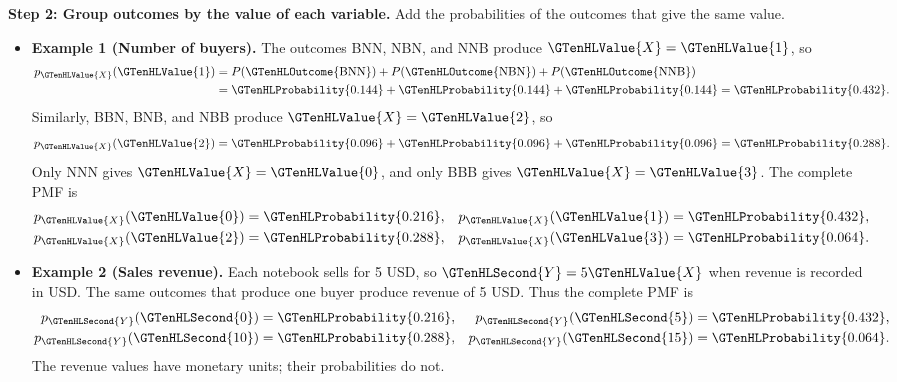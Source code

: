 \textbf{Step 2: Group outcomes by the value of each variable.} Add the probabilities of the outcomes that give the same value.

\begin{itemize}
	\item \textbf{Example 1 (Number of buyers).}
	The outcomes BNN, NBN, and NNB produce $\GTenHLValue{X}=\GTenHLValue{1}$, so
	\[
	\begin{aligned}
		p_{\GTenHLValue{X}}(\GTenHLValue{1})
		&=P(\GTenHLOutcome{\mathrm{BNN}})+P(\GTenHLOutcome{\mathrm{NBN}})+P(\GTenHLOutcome{\mathrm{NNB}})\\
		&=\GTenHLProbability{0.144}+\GTenHLProbability{0.144}+\GTenHLProbability{0.144}=\GTenHLProbability{0.432}.
	\end{aligned}
	\]
	Similarly, BBN, BNB, and NBB produce $\GTenHLValue{X}=\GTenHLValue{2}$, so
	\[
	p_{\GTenHLValue{X}}(\GTenHLValue{2})=\GTenHLProbability{0.096}+\GTenHLProbability{0.096}+\GTenHLProbability{0.096}=\GTenHLProbability{0.288}.
	\]
	Only NNN gives $\GTenHLValue{X}=\GTenHLValue{0}$, and only BBB gives $\GTenHLValue{X}=\GTenHLValue{3}$.
	The complete PMF is
	\[
	\begin{aligned}
		p_{\GTenHLValue{X}}(\GTenHLValue{0})&=\GTenHLProbability{0.216}, & p_{\GTenHLValue{X}}(\GTenHLValue{1})&=\GTenHLProbability{0.432},\\
		p_{\GTenHLValue{X}}(\GTenHLValue{2})&=\GTenHLProbability{0.288}, & p_{\GTenHLValue{X}}(\GTenHLValue{3})&=\GTenHLProbability{0.064}.
	\end{aligned}
	\]
	
	\item \textbf{Example 2 (Sales revenue).}
	Each notebook sells for 5 USD, so $\GTenHLSecond{Y}=5\GTenHLValue{X}$ when revenue
	is recorded in USD. The same outcomes that produce one
	buyer produce revenue of 5 USD. Thus the complete PMF is
	\[
	\begin{aligned}
		p_{\GTenHLSecond{Y}}(\GTenHLSecond{0})&=\GTenHLProbability{0.216}, & p_{\GTenHLSecond{Y}}(\GTenHLSecond{5})&=\GTenHLProbability{0.432},\\
		p_{\GTenHLSecond{Y}}(\GTenHLSecond{10})&=\GTenHLProbability{0.288}, & p_{\GTenHLSecond{Y}}(\GTenHLSecond{15})&=\GTenHLProbability{0.064}.
	\end{aligned}
	\]
	The revenue values have monetary units; their
	probabilities do not.
	

\end{itemize}
